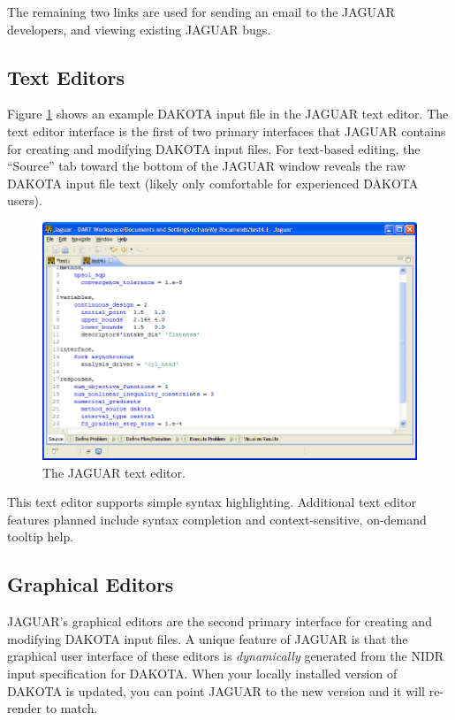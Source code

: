 The remaining two links are used for sending an email to the JAGUAR
developers, and viewing existing JAGUAR bugs.


\subsection{Text Editors}

Figure \ref{fig:input:jag_texteditor} shows an example DAKOTA input
file in the JAGUAR text editor.  The text editor interface is the
first of two primary interfaces that JAGUAR contains for creating and
modifying DAKOTA input files.  For text-based editing, the ``Source''
tab toward the bottom of the JAGUAR window reveals the raw DAKOTA
input file text (likely only comfortable for experienced DAKOTA
users).
\begin{figure}
  \centering
  \includegraphics[scale=0.4]{images/jag_texteditor}
  \caption{The JAGUAR text editor.}
  \label{fig:input:jag_texteditor}
\end{figure}

This text editor supports simple syntax highlighting.  Additional text
editor features planned include syntax completion and
context-sensitive, on-demand tooltip help.


\subsection{Graphical Editors}

JAGUAR's graphical editors are the second primary interface for
creating and modifying DAKOTA input files.  A unique feature of JAGUAR
is that the graphical user interface of these editors is {\em
dynamically} generated from the NIDR input specification for DAKOTA.
When your locally installed version of DAKOTA is updated, you can
point JAGUAR to the new version and it will re-render to match.

